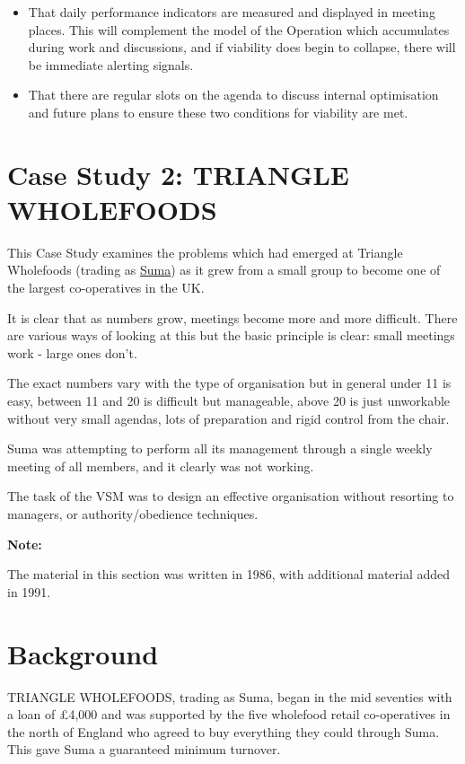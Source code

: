 \begin{itemize}
  \item That daily performance indicators are measured and displayed in meeting places. This will complement the model of the Operation which accumulates during work and discussions, and if viability does begin to collapse, there will be immediate alerting signals.

  \item That there are regular slots on the agenda to discuss internal optimisation and future plans to ensure these two conditions for viability are met.

\end{itemize}

\section*{Case Study 2: TRIANGLE WHOLEFOODS}
This Case Study examines the problems which had emerged at Triangle Wholefoods (trading as \href{http://www.suma.co.uk/}{Suma}) as it grew from a small group to become one of the largest co-operatives in the UK.

It is clear that as numbers grow, meetings become more and more difficult. There are various ways of looking at this but the basic principle is clear: small meetings work - large ones don't.

The exact numbers vary with the type of organisation but in general under 11 is easy, between 11 and 20 is difficult but manageable, above 20 is just unworkable without very small agendas, lots of preparation and rigid control from the chair.

Suma was attempting to perform all its management through a single weekly meeting of all members, and it clearly was not working.

The task of the VSM was to design an effective organisation without resorting to managers, or authority/obedience techniques.

\textbf{Note:}

The material in this section was written in 1986, with additional material added in 1991.

\section*{Background}
TRIANGLE WHOLEFOODS, trading as Suma, began in the mid seventies with a loan of £4,000 and was supported by the five wholefood retail co-operatives in the north of England who agreed to buy everything they could through Suma. This gave Suma a guaranteed minimum turnover.

